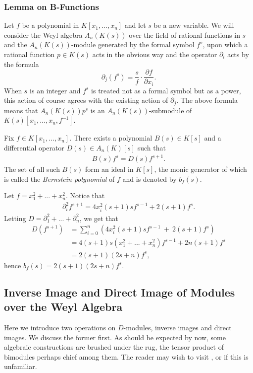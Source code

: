 \subsubsection{Lemma on B-Functions}
Let $f$ be a polynomial in $K[x_1,...,x_n]$ and let $s$ be a new variable. We will consider the Weyl algebra $A_n(K(s))$ over the field of rational functions in $s$ and the $A_n(K(s))$-module generated by the formal symbol $f^s$, upon which a rational function $p \in K(s)$ acts in the obvious way and the operator $\partial_i$ acts by the formula
\begin{equation}\label{eqn:formula-preceeding-b-func}
	\partial_j\left(f^s\right) = \frac{s}{f}\cdot \frac{\partial f}{\partial x_i}.
\end{equation}
When $s$ is an integer and $f^s$ is treated not as a formal symbol but as a power, this action of course agrees with the existing action of $\partial_j$. The above formula means that $A_n(K(s))p^s$ is an $A_n(K(s))$-submodule of $K(s)[x_1,...,x_n,f^{-1}]$.

\begin{thm}\label{thm:b-functions-Weyl}
	Fix $f \in K[x_1,...,x_n]$. There exists a polynomial $B(s) \in K[s]$ and a differential operator $D(s)\in A_n(K)[s]$ such that
	\begin{align*}
		B(s)f^s = D(s) f^{s+1}.
	\end{align*}
	The set of all such $B(s)$ form an ideal in $K[s]$, the monic generator of which is called the \emph{Bernstein polynomial} of $f$ and is denoted by $b_f(s)$.
\end{thm}
\begin{example}\label{example:explicit-b-function1}
	Let $f = x_1^2+...+x_n^2$. Notice that
	\begin{align*}
		\partial_i^2 f^{s+1} = 4x_i^2(s+1)sf^{s-1} + 2(s+1)f^s.
	\end{align*}
	Letting $D = \partial_1^2 + ... + \partial_n^2$, we get that
	\begin{align*}
		D(f^{s+1})
		  &= \sum_{i=0}^n \left(4x_i^2(s+1)sf^{s-1} ~+~ 2(s+1)f^s\right) \\
		  &= 4(s+1)s(x_1^2+...+x_n^2)f^{s-1} + 2n(s+1)f^s \\
		  &= 2(s+1)(2s+ n)f^s,
	\end{align*}
	hence $b_f(s) = 2(s+1)(2s+n)f^s$.
\end{example}

\subsection{Inverse Image and Direct Image of Modules over the Weyl Algebra}
Here we introduce two operations on $D$-modules, inverse images and direct images. We discuss the former first. As should be expected by now, some algebraic constructions are brushed under the rug, the tensor product of bimodules perhaps chief among them. The reader may wish to visit \cite{d-mod-primer}, \cite{d-mod_ps_rt} or \cite{ginzburg_d-mod} if this is unfamiliar.

